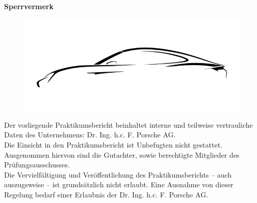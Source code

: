 {\Huge \bf Sperrvermerk} \\

\vspace*{1cm}

\begin{figure}
	\includegraphics[width=\linewidth]{Pictures/Pictures/PorscheSil.png}
\end{figure}	

Der vorliegende Praktikumsbericht beinhaltet interne und teilweise vertrauliche Daten
des Unternehmens: Dr. Ing. h.c. F. Porsche AG.\\

Die Einsicht in den Praktikumsbericht ist Unbefugten nicht gestattet. Ausgenommen
hiervon sind die Gutachter, sowie berechtigte Mitglieder des Prüfungsausschusses.\\
Die Vervielfältigung und Veröffentlichung des Praktikumsberichts – auch auszugsweise – ist
grundsätzlich nicht erlaubt. Eine Ausnahme von dieser Regelung bedarf einer Erlaubnis
der Dr. Ing. h.c. F. Porsche AG.\\










